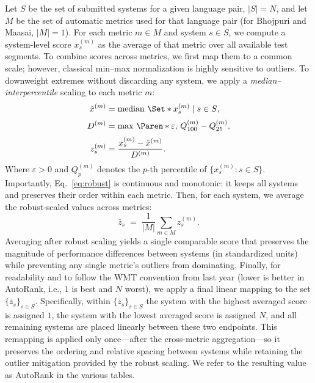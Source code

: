 \documentclass[11pt]{article}
\DeclareMathOperator*{\median}{median}
\newcommand{\Q}[2]{Q^{(#1)}_{#2}} %
\DeclarePairedDelimiter\Set\{\}{}
\DeclarePairedDelimiter\Paren()   %
\begin{document}
Let $S$ be the set of submitted systems for a given language pair, $|S|=N$, and let $M$ be the set of automatic metrics used for that language pair (for Bhojpuri and Maasai, $|M|=1$). For each metric $m\in M$ and system $s\in S$, we compute a system-level score $x^{(m)}_s$ as the average of that metric over all available test segments. To combine scores across metrics, we first map them to a common scale; however, classical min–max normalization is highly sensitive to outliers. To downweight extremes without discarding any system, we apply a \emph{median--inter\-percentile} scaling to each metric $m$:
\begin{subequations}\label{eq:robust}
\begin{align}
\tilde{x}^{(m)} &= \median\,\Set*{x^{(m)}_s \mid s \in S},\\[2pt]
D^{(m)} &= \max\,\Paren*{\varepsilon,\, \Q{m}{100} - \Q{m}{25}},\\[2pt]
z^{(m)}_s &= \frac{x^{(m)}_s - \tilde{x}^{(m)}}{D^{(m)}}.
\end{align}
\end{subequations}
Where $\varepsilon>0$ and $\Q{m}{p}$ denotes the $p$-th percentile of $\{x^{(m)}_s : s\in S\}$. Importantly, Eq.~\eqref{eq:robust} is continuous and monotonic: it keeps all systems and preserves their order within each metric. Then, for each system, we average the robust-scaled values across metrics:
\begin{equation}
    \bar{z}_s \;=\; \frac{1}{|M|}\sum_{m\in M} z^{(m)}_s .
    \label{eq:avgz}
\end{equation}
Averaging after robust scaling yields a single comparable score that preserves the magnitude of performance differences between systems (in standardized units) while preventing any single metric’s outliers from dominating. Finally, for readability and to follow the WMT convention from last year (lower is better in AutoRank, i.e., $1$ is best and $N$ worst), we apply a final linear mapping to the set $\{\bar{z}_s\}_{s\in S}$. Specifically, within $\{\bar{z}_s\}_{s\in S}$ the system with the highest averaged score is assigned $1$, the system with the lowest averaged score is assigned $N$, and all remaining systems are placed linearly between these two endpoints. This remapping is applied only once—after the cross-metric aggregation—so it preserves the ordering and relative spacing between systems while retaining the outlier mitigation provided by the robust scaling. We refer to the resulting value as AutoRank in the various tables.
\end{document}
